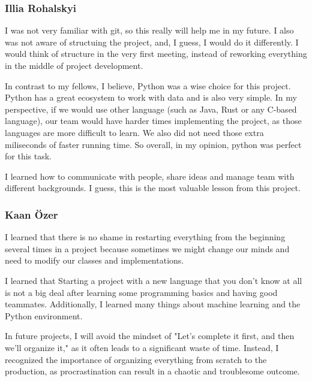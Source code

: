 \subsubsection{Illia Rohalskyi}


I was not very familiar with git, so this really will help me in my future. I also was not aware of structuing the project, and, I guess, I would do it differently. I would think of structure in the very first meeting, instead of reworking everything in the middle of project development.

\vspace{\baselineskip}


 In contrast to my fellows, I believe, Python was a wise choice for this project. Python has a great ecosystem to work with data and is also very simple. In my perspective, if we would use other language (such as Java, Rust or any C-based language), our team would have harder times implementing the project, as those languages are more difficult to learn. We also did not need those extra miliseconds of faster running time. So overall, in my opinion, python was perfect for this task.

\vspace{\baselineskip}

 
I learned how to communicate with people, share ideas and manage team with different backgrounds. I guess, this is the most valuable lesson from this project.


\subsubsection{Kaan Özer}

I learned that there is no shame in restarting everything from the beginning several times in a project because sometimes we might change our minds and need to modify our classes and implementations. 


\vspace{\baselineskip}

 

I learned that Starting a project with a new language that you don't know at all is not a big deal after learning some programming basics and having good teammates. Additionally, I learned many things about machine learning and the Python environment.


\vspace{\baselineskip}


In future projects, I will avoid the mindset of "Let's complete it first, and then we'll organize it," as it often leads to a significant waste of time. Instead, I recognized the importance of organizing everything from scratch to the production, as procrastination can result in a chaotic and troublesome outcome.

